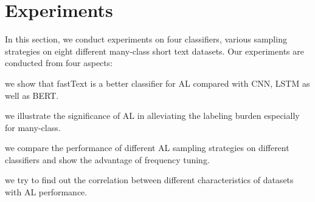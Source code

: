 
\section{Experiments}
\label{sec:eval}
In this section, we conduct experiments on four classifiers, various sampling
strategies on eight different many-class short text datasets. 
Our experiments are conducted from four aspects:
\begin{enumerate*}[label=(\arabic*)] 
	\item we show that fastText is a better classifier for AL 
compared with CNN, LSTM as well as BERT. 
	\item we illustrate the significance of AL in alleviating the 
labeling burden especially for many-class. 
	\item we compare the performance of different AL sampling strategies on different classifiers and show the advantage of frequency tuning. 
	\item we try to find out the correlation between different characteristics of datasets with AL performance.
\end{enumerate*}

